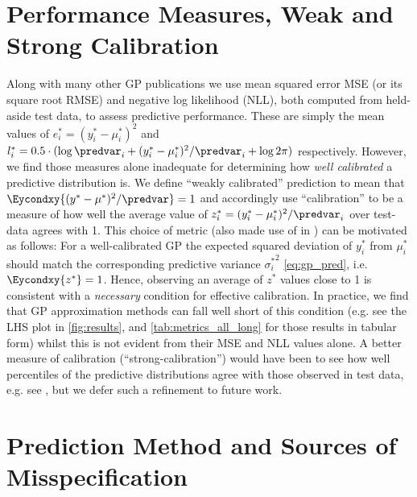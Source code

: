 \section{Performance Measures, Weak and Strong Calibration}
\label{predictive_measures}
Along with many other GP publications we use mean squared error MSE (or its square root RMSE) and negative log likelihood (NLL), both computed from held-aside test data, to assess predictive performance. These are simply the mean values of $e^*_i=(y^*_i - {\mu_i^*})^2$ and $l^*_i= 0.5 \cdot (\log \predvar_i + (y_i^*-\mu_i^*)^2/\predvar_i + \log2\pi)$ respectively. However, we find those measures alone inadequate for determining how {\it well calibrated} a predictive distribution is. We define ``weakly calibrated'' prediction to mean that $\Eycondxy{(y^*-\mu^*)^2/\predvar } = 1$ and accordingly use ``calibration'' to be a measure of how well the average value of $z^*_i= (y_i^*-\mu_i^*)^2 / \predvar_{i}$ over test-data agrees with 1. This choice of metric (also made use of in \cite{Jankowiak2020}) can be motivated as follows: For a well-calibrated GP the expected squared deviation of $y_i^*$ from $\mu_i^*$ should match the corresponding predictive variance ${\sigma_i^*}^2$ \eqref{eq:gp_pred}, i.e.  $\Eycondxy{z^*} =1$.  Hence, observing an average of $z^*$ values close to 1 is consistent with a {\it necessary} condition for effective calibration. In practice, we find that GP approximation methods can fall well short of this condition (e.g. see the LHS plot in \autoref{fig:results}, and \autoref{tab:metrics_all_long} for those results in tabular form) whilst this is not evident from their MSE and NLL values alone. A better measure of calibration (``strong-calibration'') would have been to see how well percentiles of the predictive distributions agree with those observed in test data, e.g. see \cite{Song2019}, but we defer such a refinement to future work.


\section{Prediction Method and Sources of Misspecification}



